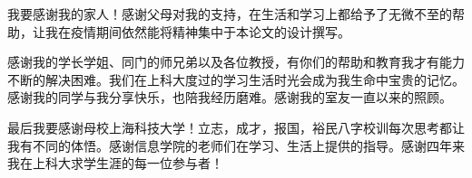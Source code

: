 我要感谢我的家人！感谢父母对我的支持，在生活和学习上都给予了无微不至的帮助，让我在疫情期间依然能将精神集中于本论文的设计撰写。

感谢我的学长学姐、同门的师兄弟以及各位教授，有你们的帮助和教育我才有能力不断的解决困难。我们在上科大度过的学习生活时光会成为我生命中宝贵的记忆。感谢我的同学与我分享快乐，也陪我经历磨难。感谢我的室友一直以来的照顾。

最后我要感谢母校上海科技大学！立志，成才，报国，裕民八字校训每次思考都让我有不同的体悟。感谢信息学院的老师们在学习、生活上提供的指导。感谢四年来我在上科大求学生涯的每一位参与者！

\cleardoublepage[plain]%

